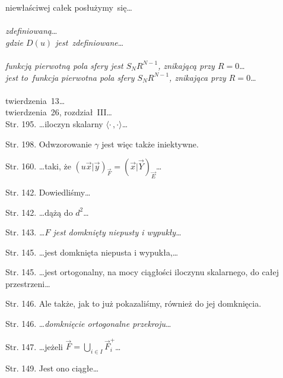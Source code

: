 \documentclass[a4paper,11pt]{article}
\begin{document}
\Pow  niewłaściwej całek posłużymy~się\ldots \\
 \\
\Jest \emph{zdefiniowaną}\ldots \\
\Pow  \emph{gdzie $D( u )$ jest~zdefiniowane}\ldots \\
 \\
\Jest \emph{funkcją pierwotną pola sfery jest $S_{ N } R^{ N - 1 }$,
  znikającą przy $R = 0$}\ldots \\
\Pow \emph{jest to~funkcja pierwotna pola sfery $S_{ N } R^{ N - 1 }$,
  znikająca przy $R = 0$}\ldots \\
 \\
\Jest twierdzenia~13\ldots \\
\Pow twierdzenia~26, rozdział~III\ldots \\


















\start Str. 195. \ldots iloczyn skalarny
$\langle \cdot \,, \cdot \rangle$\ldots

\start Str. 198. Odwzorowanie $\gamma$ jest więc także iniektywne.

\start Str. 160. \ldots taki, że
$( u\vec{ x } | \vec{ y } )_{ \vec{ F } } = ( \vec{ x } | \vec{ Y }
)_{ \vec{ E } }$\ldots

\start Str. 142. Dowiedliśmy\ldots

\start Str. 142. \ldots dążą do $d^{ 2 }$\ldots

\start Str. 143. \emph{\ldots$F$ jest domknięty niepusty i
  wypukły\ldots}

\start Str. 145. \ldots jest domknięta niepusta i wypukła,\ldots

\start Str. 145. \ldots jest ortogonalny, na mocy ciągłości iloczynu
skalarnego, do całej przestrzeni\ldots

\start Str. 146. Ale także, jak to już pokazaliśmy, również do jej
domknięcia.

\start Str. 146. \ldots\emph{domknięcie ortogonalne przekroju}\ldots

\start Str. 147. \ldots jeżeli
$\vec{ F } = \bigcup_{ i \in I } \vec{ F }_{ i }^{ + }$\ldots

\start Str. 149. Jest ono ciągłe\ldots
\end{document}
